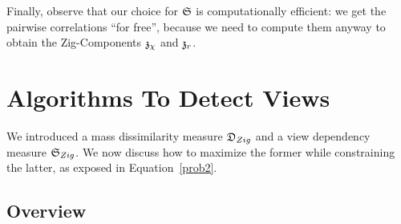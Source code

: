 Finally, observe that our choice for $\mathfrak{S}$ is computationally efficient: we
get the pairwise correlations ``for free'', because we need to compute them
anyway to obtain the Zig-Components $\mathfrak{z}_{\chi}$ and $\mathfrak{z}_r$.

\section{Algorithms To Detect Views}
\label{sec:algorithm}

We introduced a mass dissimilarity measure $\mathfrak{D}_{Zig}$ and a view dependency
measure $\mathfrak{S}_{Zig}$. We now discuss how to maximize the former while
constraining the latter, as exposed in Equation~\ref{prob2}.

\subsection{Overview}
\label{sec:overview}

